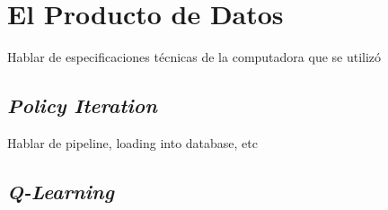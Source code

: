 \chapter{El Producto de Datos}

Hablar de especificaciones t\'ecnicas de la computadora que se utiliz\'o

\section{\textit{Policy Iteration}}

Hablar de pipeline, loading into database, etc


\section{\textit{Q-Learning}}



